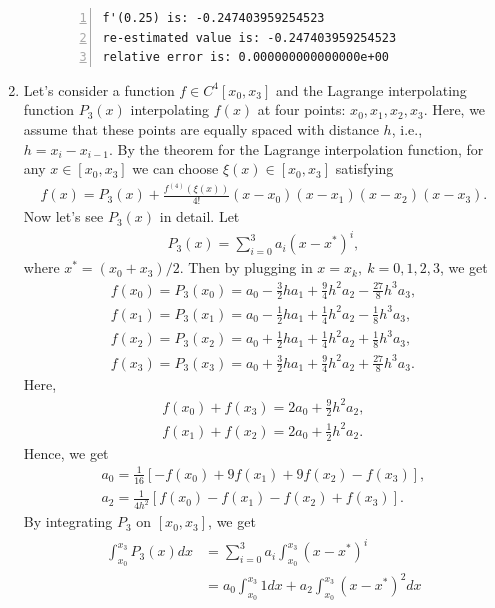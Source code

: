\documentclass{article}
\begin{document}
\begin{enumerate}
\begin{enumerate}[wide=10pt]
\begin{lstlisting}[frame=single, numbers=left, style=Matlab-editor]
f'(0.25) is: -0.247403959254523
re-estimated value is: -0.247403959254523
relative error is: 0.000000000000000e+00
        \end{lstlisting}
    \end{enumerate}
    \item Let's consider a function $f\in C^4[x_0, x_3]$ and the Lagrange interpolating function $P_3(x)$ interpolating $f(x)$ at four points: $x_0, x_1, x_2, x_3$. Here, we assume that these points are equally spaced with distance $h$, i.e., $h = x_i-x_{i-1}$. By the theorem for the Lagrange interpolation function, for any $x \in [x_0, x_3]$ we can choose $\xi(x) \in [x_0, x_3]$ satisfying \begin{align}
        f(x) = P_3(x) + \frac{f^{(4)}(\xi(x))}{4!}(x-x_0)(x-x_1)(x-x_2)(x-x_3).
    \end{align}
    Now let's see $P_3(x)$ in detail. Let \begin{align*}
        P_3(x) = \sum_{i=0}^{3} a_i(x-x^*)^i,
    \end{align*} where $x^* = (x_0+x_3)/2$. Then by plugging in $x=x_k,\ k=0,1,2,3$, we get \begin{align*}
        f(x_0) = P_3(x_0) = a_0 - \frac{3}{2}ha_1 + \frac{9}{4}h^2a_2 - \frac{27}{8}h^3a_3,
        \\
        f(x_1) = P_3(x_1) = a_0 - \frac{1}{2}ha_1 + \frac{1}{4}h^2a_2 - \frac{1}{8}h^3a_3,
        \\
        f(x_2) = P_3(x_2) = a_0 + \frac{1}{2}ha_1 + \frac{1}{4}h^2a_2 + \frac{1}{8}h^3a_3,
        \\
        f(x_3) = P_3(x_3) = a_0 + \frac{3}{2}ha_1 + \frac{9}{4}h^2a_2 + \frac{27}{8}h^3a_3.
    \end{align*} Here, \begin{align*}
        f(x_0)+f(x_3) = 2a_0 + \frac{9}{2}h^2a_2,
        \\
        f(x_1)+f(x_2) = 2a_0 + \frac{1}{2}h^2a_2.
    \end{align*} Hence, we get \begin{align*}
        a_0 = \frac{1}{16}[-f(x_0)+9f(x_1)+9f(x_2)-f(x_3)],
        \\
        a_2 = \frac{1}{4h^2}[f(x_0)-f(x_1)-f(x_2)+f(x_3)].
    \end{align*} By integrating $P_3$ on $[x_0, x_3]$, we get \begin{align}
        \begin{split}
            \int_{x_0}^{x_3}P_3(x) dx
            & = \sum_{i=0}^{3}a_i \int_{x_0}^{x_3}(x-x^*)^i
            \\ & = a_0\int_{x_0}^{x_3}1dx + a_2\int_{x_0}^{x_3}(x-x^*)^2dx

\end{split}
\end{align}
\end{enumerate}
\end{document}
